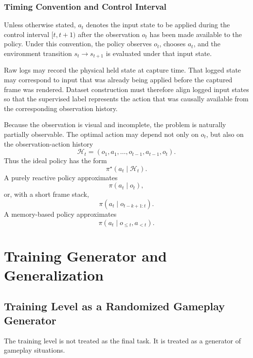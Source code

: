 \documentclass[11pt]{article}
\begin{document}
\subsubsection{Timing Convention and Control Interval}

Unless otherwise stated, \(a_t\) denotes the input state to be applied during the control interval \([t,t+1)\) after the observation \(o_t\) has been made available to the policy. Under this convention, the policy observes \(o_t\), chooses \(a_t\), and the environment transition \(s_t \rightarrow s_{t+1}\) is evaluated under that input state.

Raw logs may record the physical held state at capture time. That logged state may correspond to input that was already being applied before the captured frame was rendered. Dataset construction must therefore align logged input states so that the supervised label represents the action that was causally available from the corresponding observation history.

Because the observation is visual and incomplete, the problem is naturally partially observable. The optimal action may depend not only on \(o_t\), but also on the observation-action history
\[
  \mathcal{H}_t = (o_1,a_1,\ldots,o_{t-1},a_{t-1},o_t).
\]
Thus the ideal policy has the form
\[
  \pi^\star(a_t \mid \mathcal{H}_t).
\]
A purely reactive policy approximates
\[
  \pi(a_t \mid o_t),
\]
or, with a short frame stack,
\[
  \pi(a_t \mid o_{t-k+1:t}).
\]
A memory-based policy approximates
\[
  \pi(a_t \mid o_{\le t}, a_{<t}).
\]

\section{Training Generator and Generalization}

\subsection{Training Level as a Randomized Gameplay Generator}

The training level is not treated as the final task. It is treated as a generator of gameplay situations.
\end{document}
